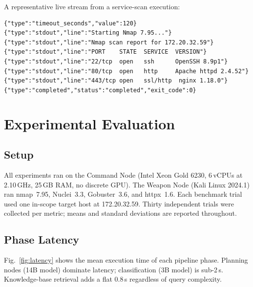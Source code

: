 \documentclass[conference]{IEEEtran}
\begin{document}
A representative live stream from a service-scan execution:

\begin{lstlisting}[style=terminal,caption={Real-time NDJSON stream (truncated)}]
{"type":"timeout_seconds","value":120}
{"type":"stdout","line":"Starting Nmap 7.95..."}
{"type":"stdout","line":"Nmap scan report for 172.20.32.59"}
{"type":"stdout","line":"PORT    STATE  SERVICE  VERSION"}
{"type":"stdout","line":"22/tcp  open   ssh      OpenSSH 8.9p1"}
{"type":"stdout","line":"80/tcp  open   http     Apache httpd 2.4.52"}
{"type":"stdout","line":"443/tcp open   ssl/http  nginx 1.18.0"}
{"type":"completed","status":"completed","exit_code":0}
\end{lstlisting}

\section{Experimental Evaluation}

\subsection{Setup}

All experiments ran on the Command Node (Intel Xeon Gold 6230,
6\,vCPUs at 2.10\,GHz, 25\,GB RAM, no discrete GPU).
The Weapon Node (Kali Linux 2024.1) ran nmap~7.95, Nuclei~3.3,
Gobuster~3.6, and httpx~1.6.
Each benchmark trial used one in-scope target host at 172.20.32.59.
Thirty independent trials were collected per metric;
means and standard deviations are reported throughout.

\subsection{Phase Latency}

Fig.~\ref{fig:latency} shows the mean execution time of each pipeline
phase. Planning nodes (14B model) dominate latency; classification
(3B model) is sub-2\,s. Knowledge-base retrieval adds a flat 0.8\,s
regardless of query complexity.
\end{document}
